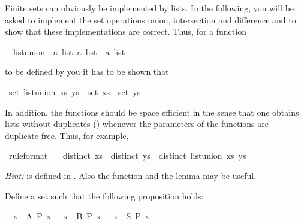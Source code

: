 \begin{isabellebody}
{}
\isamarkuptrue%
%
\begin{isamarkuptext}%
Finite sets can obviously be implemented by lists. In the
following, you will be asked to implement the set operations union,
intersection and difference and to show that these implementations are
correct. Thus, for a function%
\end{isamarkuptext}%
\isamarkuptrue%
\ \ list{\isacharunderscore}union\ {\isacharcolon}{\isacharcolon}\ {\isachardoublequote}{\isacharbrackleft}{\isacharprime}a\ list{\isacharcomma}\ {\isacharprime}a\ list{\isacharbrackright}\ {\isasymRightarrow}\ {\isacharprime}a\ list{\isachardoublequote}\isamarkupfalse%
%
\begin{isamarkuptext}%
to be defined by you it has to be shown that%
\end{isamarkuptext}%
\isamarkuptrue%
\ {\isachardoublequote}set\ {\isacharparenleft}list{\isacharunderscore}union\ xs\ ys{\isacharparenright}\ {\isacharequal}\ set\ xs\ {\isasymunion}\ set\ ys{\isachardoublequote}\isamarkupfalse%
\isamarkupfalse%
%
\begin{isamarkuptext}%
In addition, the functions should be space efficient in the
sense that one obtains lists without duplicates ()
whenever the parameters of the functions are duplicate-free. Thus, for
example,%
\end{isamarkuptext}%
\isamarkuptrue%
\ {\isacharbrackleft}rule{\isacharunderscore}format{\isacharbrackright}{\isacharcolon}\ \isanewline
\ \ {\isachardoublequote}distinct\ xs\ {\isasymlongrightarrow}\ distinct\ ys\ {\isasymlongrightarrow}\ {\isacharparenleft}distinct\ {\isacharparenleft}list{\isacharunderscore}union\ xs\ ys{\isacharparenright}{\isacharparenright}{\isachardoublequote}\isamarkupfalse%
\isamarkupfalse%
%
\begin{isamarkuptext}%
\emph{Hint:}  is defined in . Also the function  and the lemma  may be useful.%
\end{isamarkuptext}%
\isamarkuptrue%
%
\isamarkuptrue%
%
\begin{isamarkuptext}%
Define a set  such that the following proposition holds:%
\end{isamarkuptext}%
\isamarkuptrue%
\ {\isachardoublequote}{\isacharparenleft}{\isacharparenleft}{\isasymforall}\ x\ {\isasymin}\ A{\isachardot}\ P\ x{\isacharparenright}\ {\isasymand}\ {\isacharparenleft}{\isasymforall}\ x\ {\isasymin}\ B{\isachardot}\ P\ x{\isacharparenright}{\isacharparenright}\ {\isasymlongrightarrow}\ {\isacharparenleft}{\isasymforall}\ x\ {\isasymin}\ S{\isachardot}\ P\ x{\isacharparenright}{\isachardoublequote}\isamarkupfalse%

\end{isabellebody}

